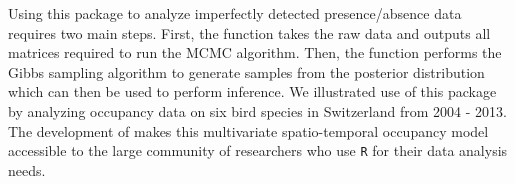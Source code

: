 Using this package to analyze imperfectly detected presence/absence data requires two main steps. First, the  function takes the raw data and outputs all matrices required to run the MCMC algorithm. Then, the  function performs the Gibbs sampling algorithm to generate samples from the posterior distribution which can then be used to perform inference. We illustrated use of this package by analyzing occupancy data on six bird species in Switzerland from 2004 - 2013. The development of  makes this multivariate spatio-temporal occupancy model accessible to the large community of researchers who use \texttt{R} for their data analysis needs. 

